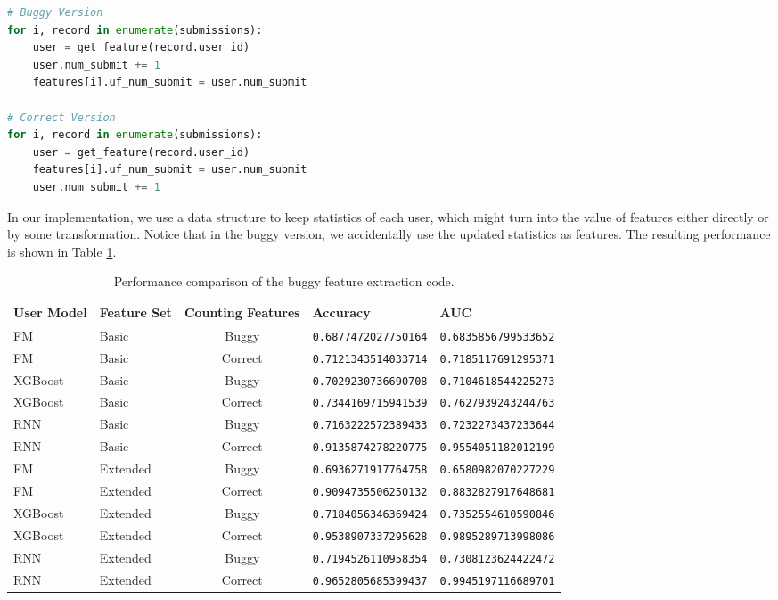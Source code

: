     \begin{lstlisting}[language=Python]
# Buggy Version
for i, record in enumerate(submissions):
    user = get_feature(record.user_id)
    user.num_submit += 1
    features[i].uf_num_submit = user.num_submit

# Correct Version
for i, record in enumerate(submissions):
    user = get_feature(record.user_id)
    features[i].uf_num_submit = user.num_submit
    user.num_submit += 1
    \end{lstlisting}

    In our implementation, we use a data structure to keep statistics of each user,
    which might turn into the value of features either directly or by some transformation.
    Notice that in the buggy version, we accidentally use the updated statistics as features.
    The resulting performance is shown in Table \ref{table:counting-feature}.

    \begin{table}[hpbt]
    \centering
    \begin{tabular}{llcll}
        \toprule
        User Model & Feature Set & Counting Features & Accuracy & AUC \\
        \hline
        \midrule
        FM      & Basic    & Buggy    & \verb|0.6877472027750164| & \verb|0.6835856799533652| \\
        FM      & Basic    & Correct  & \verb|0.7121343514033714| & \verb|0.7185117691295371| \\
        \hline
        XGBoost & Basic    & Buggy    & \verb|0.7029230736690708| & \verb|0.7104618544225273| \\
        XGBoost & Basic    & Correct  & \verb|0.7344169715941539| & \verb|0.7627939243244763| \\
        \hline
        RNN     & Basic    & Buggy    & \verb|0.7163222572389433| & \verb|0.7232273437233644| \\
        RNN     & Basic    & Correct  & \verb|0.9135874278220775| & \verb|0.9554051182012199| \\
        \hline
        \hline
        FM      & Extended & Buggy    & \verb|0.6936271917764758| & \verb|0.6580982070227229| \\
        FM      & Extended & Correct  & \verb|0.9094735506250132| & \verb|0.8832827917648681| \\
        \hline
        XGBoost & Extended & Buggy    & \verb|0.7184056346369424| & \verb|0.7352554610590846| \\
        XGBoost & Extended & Correct  & \verb|0.9538907337295628| & \verb|0.9895289713998086| \\
        \hline
        RNN     & Extended & Buggy    & \verb|0.7194526110958354| & \verb|0.7308123624422472| \\
        RNN     & Extended & Correct  & \verb|0.9652805685399437| & \verb|0.9945197116689701| \\
        \hline
    \end{tabular}
    \caption{Performance comparison of the buggy feature extraction code.}
    \label{table:counting-feature}
    \end{table}

